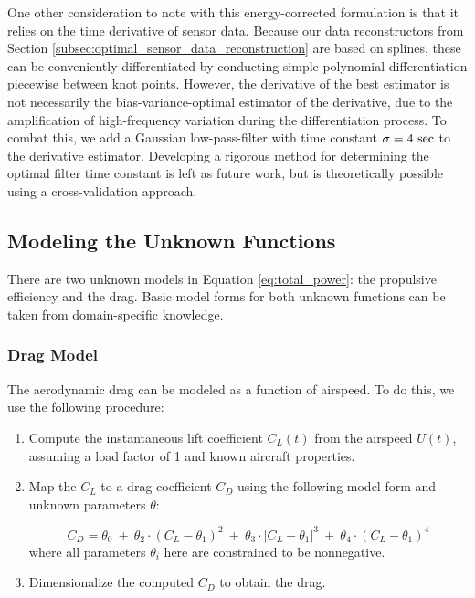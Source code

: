 \documentclass[conf]{new-aiaa}
\begin{document}
    One other consideration to note with this energy-corrected formulation is that it relies on the time derivative of sensor data. Because our data reconstructors from Section \ref{subsec:optimal_sensor_data_reconstruction} are based on splines, these can be conveniently differentiated by conducting simple polynomial differentiation piecewise between knot points. However, the derivative of the best estimator is not necessarily the bias-variance-optimal estimator of the derivative, due to the amplification of high-frequency variation during the differentiation process. To combat this, we add a Gaussian low-pass-filter with time constant $\sigma=4\ \rm sec$ to the derivative estimator. Developing a rigorous method for determining the optimal filter time constant is left as future work, but is theoretically possible using a cross-validation approach.

    \subsection{Modeling the Unknown Functions}
    \label{subsec:modeling_unknown_functions}

    There are two unknown models in Equation \ref{eq:total_power}: the propulsive efficiency and the drag. Basic model forms for both unknown functions can be taken from domain-specific knowledge.

    \subsubsection{Drag Model}
    \label{subsubsec:drag_model}
    The aerodynamic drag can be modeled as a function of airspeed. To do this, we use the following procedure:

    \begin{enumerate}
        \item Compute the instantaneous lift coefficient $C_L(t)$ from the airspeed $U(t)$, assuming a load factor of 1 and known aircraft properties.
        \item Map the $C_L$ to a drag coefficient $C_D$ using the following model form and unknown parameters $\theta$:

        \begin{equation*}
            C_D =
            \theta_0
            \: + \: \theta_2 \cdot (C_L - \theta_1)^2
            \: + \: \theta_3 \cdot |C_L - \theta_1|^3
            \: + \: \theta_4 \cdot (C_L - \theta_1)^4
            \label{eq:drag_coefficient}
        \end{equation*}
        \noindent where all parameters $\theta_i$ here are constrained to be nonnegative.
        \item Dimensionalize the computed $C_D$ to obtain the drag.
    \end{enumerate}
\end{document}
